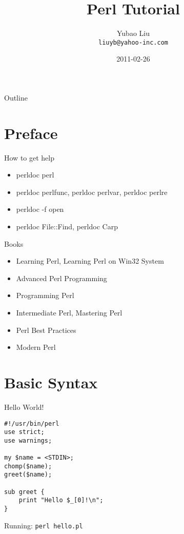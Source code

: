 \documentclass{beamer}
\title{Perl Tutorial}
\author{Yubao Liu \\ \texttt{liuyb@yahoo-inc.com}}
\institute{Yahoo! Global R \& D Center, Beijing}
\date{2011-02-26}
\begin{document}
\begin{frame}
  \titlepage
\end{frame}

\begin{frame}{Outline}
  \tableofcontents
\end{frame}

\section{Preface}

\begin{frame}{How to get help}
  \begin{itemize}
    \item perldoc perl
    \item perldoc perlfunc, perldoc perlvar, perldoc perlre
    \item perldoc -f open
    \item perldoc File::Find, perldoc Carp
  \end{itemize}
\end{frame}

\begin{frame}{Books}
  \begin{itemize}
    \item  Learning Perl, Learning Perl on Win32 System
    \item  Advanced Perl Programming
    \item  Programming Perl
    \item  Intermediate Perl, Mastering Perl
    \item  Perl Best Practices
    \item  Modern Perl
  \end{itemize}
\end{frame}

\section{Basic Syntax}

\begin{frame}[containsverbatim]{Hello World!}
\begin{lstlisting}[caption=Greeting from Perl]
#!/usr/bin/perl
use strict;
use warnings;

my $name = <STDIN>;
chomp($name);
greet($name);

sub greet {
    print "Hello $_[0]!\n";
}
\end{lstlisting}

Running: \texttt{perl hello.pl}
\end{frame}
\end{document}

